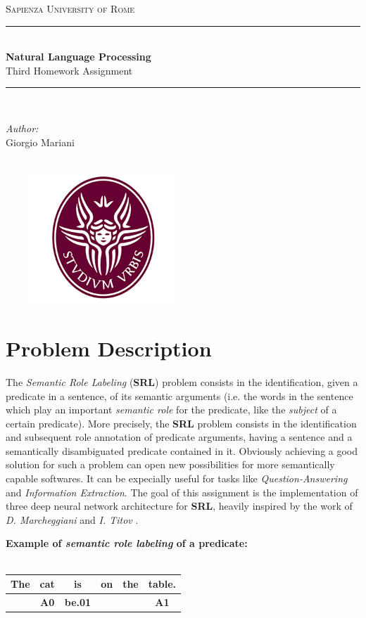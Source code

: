 \documentclass[a4paper,10pt,twocolumn]{article}
\newcommand{\SRL}{\textbf{SRL}}
\begin{document}
\begin{titlepage}
\newcommand{\HRule}{\rule{\linewidth}{0.5mm}}
\center 
\textsc{\LARGE Sapienza University of Rome }\\[2cm] 

\HRule \\[0.4cm]
{ \Huge \textbf {Natural Language Processing}}\\[0.5cm]
{\huge {Third Homework Assignment}}\\[0.4cm]
\HRule \\[1.5cm]

\author{Giorgio Mariani}

\begin{centering}
 \LARGE
\emph{Author:} \\[0.25cm]
Giorgio Mariani
\end{centering} \\[3cm]
\includegraphics[width=7.4cm]{logo.png}
\vfill 
\end{titlepage}
\newpage{}


\section{Problem Description}
The \emph{Semantic Role Labeling} (\SRL) problem \cite{srl} consists in the identification, given a predicate in a sentence, of its semantic arguments (i.e. the words in the sentence which play an important \emph{semantic role} for the predicate, like the \emph{subject} of a certain predicate). More precisely, the \SRL{} problem consists in the identification and subsequent role annotation of  predicate arguments, having a sentence and a semantically disambiguated predicate contained in it. Obviously achieving a good solution for such a problem can open new possibilities for more semantically capable softwares.  It can be expecially useful for tasks like \emph{Question-Answering} and \emph{Information Extraction}.
The goal of this assignment is the implementation of three deep neural network architecture for \SRL{}, heavily inspired by the work of \emph{D. Marcheggiani} and \emph{I. Titov} \cite{simple} \cite{gcn}.
\begin{table}[h!]

\centering
\textbf{Example of \emph{semantic role labeling} of a predicate:}\\~\\
\begin{tabular}{|c|c|c|c|c|c|}\hline
The &cat &is &on &the &table.\\\hline\hline
&\textbf{A0}& \textbf{be.01}&&&\textbf{A1}\\\hline
\end{tabular}

\end{table}
\end{document}
